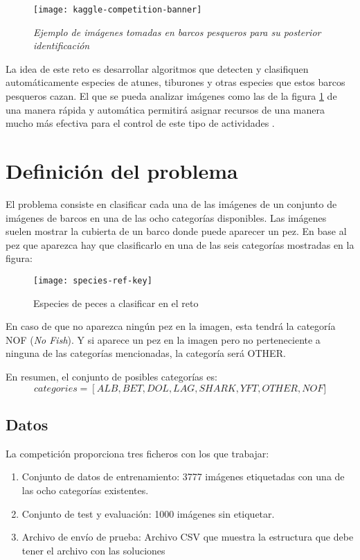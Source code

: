 \begin{figure}
  \centering
  \caption{\textit{Ejemplo de imágenes tomadas en barcos pesqueros para su posterior identificación}}
\label{kaggle-banner}
  \texttt{[image: kaggle-competition-banner]}
\end{figure}

La idea de este reto es desarrollar algoritmos que detecten y clasifiquen automáticamente especies de atunes, tiburones y otras especies que estos barcos pesqueros cazan. El que se pueda analizar imágenes como las de la figura \ref{kaggle-banner} de una manera rápida y automática permitirá asignar recursos de una manera mucho más efectiva para el control de este tipo de actividades \parencite{kaggle-page}.

\section{Definición del problema}

El problema consiste en clasificar cada una de las imágenes de un conjunto de imágenes de barcos en una de las ocho categorías disponibles. Las imágenes suelen mostrar la cubierta de un barco donde puede aparecer un pez. En base al pez que aparezca hay que clasificarlo en una de las seis categorías mostradas en la figura:

\begin{figure}
  \centering
  \caption{Especies de peces a clasificar en el reto}
\label{kaggle-fishes}
  \texttt{[image: species-ref-key]}
\end{figure}

En caso de que no aparezca ningún pez en la imagen, esta tendrá la categoría NOF (\textit{No Fish}). Y si aparece un pez en la imagen pero no perteneciente a ninguna de las categorías mencionadas, la categoría será OTHER.

En resumen, el conjunto de posibles categorías es:
\[
  categories =
  \left[ALB, BET, DOL, LAG, SHARK, YFT, OTHER, NOF]
\]

\subsection{Datos}

La competición proporciona tres ficheros con los que trabajar:

\begin{enumerate}
  \item{Conjunto de datos de entrenamiento: 3777 imágenes etiquetadas con una de las ocho categorías existentes.}
  \item{Conjunto de test y evaluación: 1000 imágenes sin etiquetar.}
  \item{Archivo de envío de prueba: Archivo CSV que muestra la estructura que debe tener el archivo con las soluciones}
\end{enumerate}

